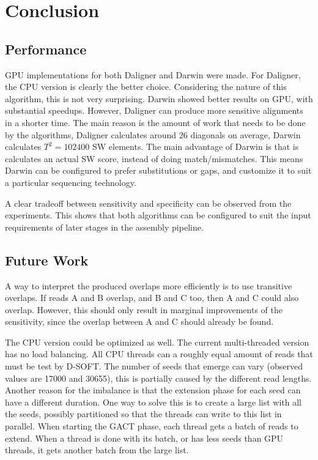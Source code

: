 \documentclass[../main/thesis.tex]{subfiles}
\begin{document}
\chapter{Conclusion}
\ifdefined\main
\else

\fi

\section{Performance}
GPU implementations for both Daligner and Darwin were made.
For Daligner, the CPU version is clearly the better choice.
Considering the nature of this algorithm, this is not very surprising.
Darwin showed better results on GPU, with substantial speedups. %
However, Daligner can produce more sensitive alignments in a shorter time.
The main reason is the amount of work that needs to be done by the algorithms, Daligner calculates around 26 diagonals on average, Darwin calculates $T^2=102400$ SW elements.
The main advantage of Darwin is that is calculates an actual SW score, instead of doing match/mismatches.
This means Darwin can be configured to prefer substitutions or gaps, and customize it to suit a particular sequencing technology.

A clear tradeoff between sensitivity and specificity can be observed from the experiments.
This shows that both algorithms can be configured to suit the input requirements of later stages in the assembly pipeline.


\section{Future Work}





A way to interpret the produced overlaps more efficiently is to use transitive overlaps.
If reads A and B overlap, and B and C too, then A and C could also overlap.
However, this should only result in marginal improvements of the sensitivity, since the overlap between A and C should already be found.



The CPU version could be optimized as well.
The current multi-threaded version has no load balancing.
All CPU threads can a roughly equal amount of reads that must be test by D-SOFT.
The number of seeds that emerge can vary (observed values are 17000 and 30655), this is partially caused by the different read lengths.
Another reason for the imbalance is that the extension phase for each seed can have a different duration.
One way to solve this is to create a large list with all the seeds, possibly partitioned so that the threads can write to this list in parallel.
When starting the GACT phase, each thread gets a batch of reads to extend.
When a thread is done with its batch, or has less seeds than GPU threads, it gets another batch from the large list.
\end{document}
